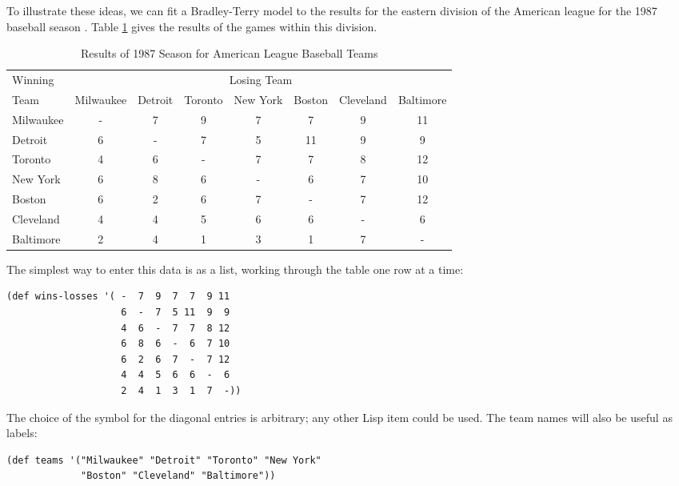 To illustrate these ideas, we can fit a Bradley-Terry model to the
results for the eastern division of the American league for the 1987
baseball season \cite{Agresti}. Table \ref{WinsLosses} gives the results
of the games within this division.
\begin{table}
\caption{Results of 1987 Season for American League Baseball Teams}
\label{WinsLosses}
\begin{center}
\begin{tabular}{lccccccc}
\hline
Winning & \multicolumn{7}{c}{Losing Team}\\
\cline{2-8}
Team & Milwaukee & Detroit & Toronto & New York & Boston &
Cleveland & Baltimore\\
\hline
Milwaukee & -  & 7  & 9  & 7  &  7  & 9 & 11\\
Detroit   & 6  & -  & 7  & 5  & 11  & 9 &  9\\
Toronto   & 4  & 6  & -  & 7  &  7  & 8 & 12\\
New York  & 6  & 8  & 6  & -  &  6  & 7 & 10\\
Boston    & 6  & 2  & 6  & 7  &  -  & 7 & 12\\
Cleveland & 4  & 4  & 5  & 6  &  6  & - &  6\\
Baltimore & 2  & 4  & 1  & 3  &  1  & 7 &  -\\
\hline
\end{tabular}
\end{center}
\end{table}

The simplest way to enter this data is as a list, working through the
table one row at a time:
\begin{verbatim}
(def wins-losses '( -  7  9  7  7  9 11
                    6  -  7  5 11  9  9
                    4  6  -  7  7  8 12
                    6  8  6  -  6  7 10
                    6  2  6  7  -  7 12
                    4  4  5  6  6  -  6
                    2  4  1  3  1  7  -))
\end{verbatim}
The choice of the symbol \dcode{-} for the diagonal entries is
arbitrary; any other Lisp item could be used. The team names will also
be useful as labels:
\begin{verbatim}
(def teams '("Milwaukee" "Detroit" "Toronto" "New York"
             "Boston" "Cleveland" "Baltimore"))
\end{verbatim}

